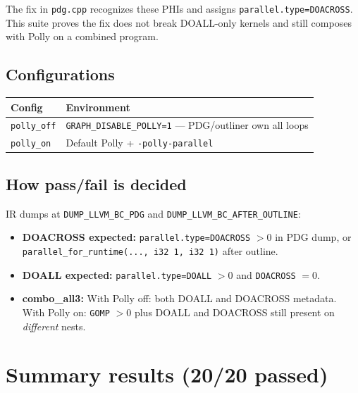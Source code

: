 \documentclass[11pt,a4paper]{article}
\newcommand{\cfg}[1]{\texttt{#1}}
\begin{document}
The fix in \texttt{pdg.cpp} recognizes these PHIs and assigns
\texttt{parallel.type=DOACROSS}. This suite proves the fix does not break
DOALL-only kernels and still composes with Polly on a combined program.

\subsection{Configurations}

\begin{center}
\begin{tabular}{ll}
\toprule
Config & Environment \\
\midrule
\cfg{polly\_off} & \texttt{GRAPH\_DISABLE\_POLLY=1} --- PDG/outliner own all loops \\
\cfg{polly\_on}  & Default Polly + \texttt{-polly-parallel} \\
\bottomrule
\end{tabular}
\end{center}

\subsection{How pass/fail is decided}

IR dumps at \texttt{DUMP\_LLVM\_BC\_PDG} and \texttt{DUMP\_LLVM\_BC\_AFTER\_OUTLINE}:
\begin{itemize}
  \item \textbf{DOACROSS expected:} \texttt{parallel.type=DOACROSS} $> 0$ in PDG dump,
        or \texttt{parallel\_for\_runtime(..., i32 1, i32 1)} after outline.
  \item \textbf{DOALL expected:} \texttt{parallel.type=DOALL} $> 0$ and
        \texttt{DOACROSS} $= 0$.
  \item \textbf{combo\_all3:} With Polly off: both DOALL and DOACROSS metadata.
        With Polly on: \texttt{GOMP} $> 0$ plus DOALL and DOACROSS still present
        on \emph{different} nests.
\end{itemize}

\section{Summary results (20/20 passed)}
\end{document}
